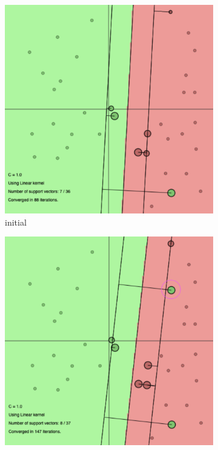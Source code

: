 \documentclass[a4paper, 11pt, one column]{article}
\begin{document}
\begin{figure}[]
		\begin{subfigure}{0.33\linewidth}
            \includegraphics[width=\linewidth]{images/lin_right_red_2.png}
            \caption{initial}
        \end{subfigure}
        \begin{subfigure}{0.33\linewidth}
            \includegraphics[width=\linewidth]{images/lin_wrong_green.png}

\end{subfigure}
\end{figure}
\end{document}
